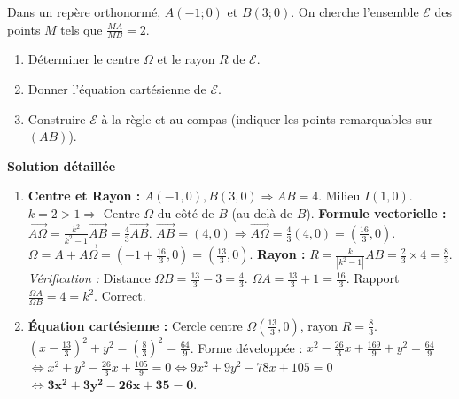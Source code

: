 \documentclass[11pt]{article}
\begin{document}
\begin{exoresolu}[Rapport de distances $\frac{MA}{MB} = k$ — Cercle d'Apollonius]
Dans un repère orthonormé, $A(-1;0)$ et $B(3;0)$. On cherche l'ensemble $\mathcal{E}$ des points $M$ tels que $\frac{MA}{MB} = 2$.
\begin{enumerate}
    \item Déterminer le centre $\Omega$ et le rayon $R$ de $\mathcal{E}$.
    \item Donner l'équation cartésienne de $\mathcal{E}$.
    \item Construire $\mathcal{E}$ à la règle et au compas (indiquer les points remarquables sur $(AB)$).
\end{enumerate}
\tcblower
\textbf{Solution détaillée}
\begin{enumerate}
    \item \textbf{Centre et Rayon :}
    $A(-1,0), B(3,0) \Rightarrow AB = 4$. Milieu $I(1,0)$.
    $k = 2 > 1 \Rightarrow$ Centre $\Omega$ du côté de $B$ (au-delà de $B$).
    \textbf{Formule vectorielle :} $\overrightarrow{A\Omega} = \frac{k^2}{k^2-1} \overrightarrow{AB} = \frac{4}{3} \overrightarrow{AB}$.
    $\overrightarrow{AB} = (4, 0) \Rightarrow \overrightarrow{A\Omega} = \frac{4}{3}(4, 0) = (\frac{16}{3}, 0)$.
    $\Omega = A + \overrightarrow{A\Omega} = (-1 + \frac{16}{3}, 0) = (\frac{13}{3}, 0)$.
    \textbf{Rayon :} $R = \frac{k}{|k^2-1|} AB = \frac{2}{3} \times 4 = \frac{8}{3}$.
    \emph{Vérification :} Distance $\Omega B = \frac{13}{3} - 3 = \frac{4}{3}$. $\Omega A = \frac{13}{3} + 1 = \frac{16}{3}$. Rapport $\frac{\Omega A}{\Omega B} = 4 = k^2$. Correct.
    
    \item \textbf{Équation cartésienne :}
    Cercle centre $\Omega(\frac{13}{3}, 0)$, rayon $R = \frac{8}{3}$.
    $(x - \frac{13}{3})^2 + y^2 = (\frac{8}{3})^2 = \frac{64}{9}$.
    Forme développée : $x^2 - \frac{26}{3}x + \frac{169}{9} + y^2 = \frac{64}{9}$
    $\iff x^2 + y^2 - \frac{26}{3}x + \frac{105}{9} = 0 \iff 9x^2 + 9y^2 - 78x + 105 = 0$
    $\iff \boldsymbol{3x^2 + 3y^2 - 26x + 35 = 0}$.
    

\end{enumerate}
\end{exoresolu}
\end{document}

